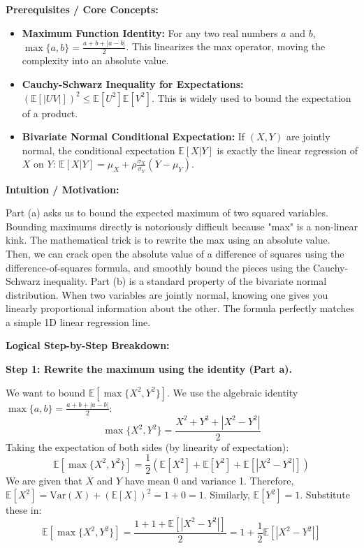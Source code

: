 \begin{solution}
\textbf{Prerequisites / Core Concepts:}
\begin{itemize}
    \item \textbf{Maximum Function Identity:} For any two real numbers $a$ and $b$, $\max\{a, b\} = \frac{a+b+|a-b|}{2}$. This linearizes the max operator, moving the complexity into an absolute value.
    \item \textbf{Cauchy-Schwarz Inequality for Expectations:} $(\mathbb{E}[|UV|])^2 \leq \mathbb{E}[U^2]\mathbb{E}[V^2]$. This is widely used to bound the expectation of a product.
    \item \textbf{Bivariate Normal Conditional Expectation:} If $(X,Y)$ are jointly normal, the conditional expectation $\mathbb{E}[X|Y]$ is exactly the linear regression of $X$ on $Y$: $\mathbb{E}[X|Y] = \mu_X + \rho \frac{\sigma_X}{\sigma_Y}(Y - \mu_Y)$.
\end{itemize}

\textbf{Intuition / Motivation:}

Part (a) asks us to bound the expected maximum of two squared variables. Bounding maximums directly is notoriously difficult because "max" is a non-linear kink. The mathematical trick is to rewrite the max using an absolute value. Then, we can crack open the absolute value of a difference of squares using the difference-of-squares formula, and smoothly bound the pieces using the Cauchy-Schwarz inequality.
Part (b) is a standard property of the bivariate normal distribution. When two variables are jointly normal, knowing one gives you linearly proportional information about the other. The formula perfectly matches a simple 1D linear regression line.

\textbf{Logical Step-by-Step Breakdown:}

\textbf{Step 1: Rewrite the maximum using the identity (Part a).}

We want to bound $\mathbb{E}[\max\{X^2, Y^2\}]$. We use the algebraic identity $\max\{a, b\} = \frac{a+b+|a-b|}{2}$:
\[ \max\{X^2, Y^2\} = \frac{X^2 + Y^2 + |X^2 - Y^2|}{2} \]
Taking the expectation of both sides (by linearity of expectation):
\[ \mathbb{E}[\max\{X^2, Y^2\}] = \frac{1}{2}\left( \mathbb{E}[X^2] + \mathbb{E}[Y^2] + \mathbb{E}[|X^2 - Y^2|] \right) \]
We are given that $X$ and $Y$ have mean 0 and variance 1. Therefore, $\mathbb{E}[X^2] = \text{Var}(X) + (\mathbb{E}[X])^2 = 1 + 0 = 1$. Similarly, $\mathbb{E}[Y^2] = 1$.
Substitute these in:
\[ \mathbb{E}[\max\{X^2, Y^2\}] = \frac{1 + 1 + \mathbb{E}[|X^2 - Y^2|]}{2} = 1 + \frac{1}{2}\mathbb{E}[|X^2 - Y^2|] \]


\end{solution}
